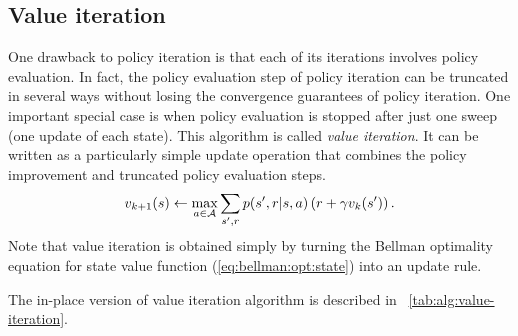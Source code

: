 \subsection{Value iteration}

One drawback to policy iteration is that each of its iterations involves policy evaluation.
In fact, the policy evaluation step of policy iteration can be truncated in several ways
without losing the convergence guarantees of policy iteration.
One important special case is when policy evaluation is stopped after just one sweep (one update of each state).
This algorithm is called \emph{value iteration}.
It can be written as a particularly simple update operation that combines the policy improvement and truncated policy evaluation steps.
\begin{equation}
v_{k+1}(s) \leftarrow \max_{a\in\mathcal{A}} \sum_{{s'}, r} p({s'}, r|s,a) \left( r + \gamma v_k({s'}) \right).
\end{equation}
Note that value iteration is obtained simply by turning the Bellman optimality equation for state value function
(\ref{eq:bellman:opt:state})
into an update rule.

The in-place version of value iteration algorithm is described in \tablename~\ref{tab:alg:value-iteration}.

